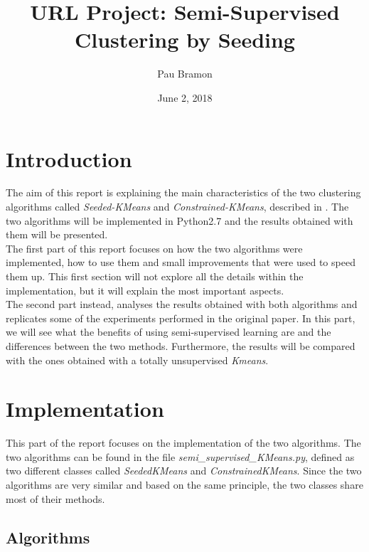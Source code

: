 \documentclass[11pt]{article}
\begin{document}
%
\title{URL Project: Semi-Supervised Clustering by Seeding}
\date{June 2, 2018}
\author{Pau Bramon}
\maketitle

\section{Introduction}

The aim of this report is explaining the main characteristics of the two clustering algorithms called \textit{Seeded-KMeans} and \textit{Constrained-KMeans}, described in \cite{Basu:2002:SCS:645531.656012}. The two algorithms will be implemented in Python2.7 and the results obtained with them will be presented. \\
The first part of this report focuses on how the two algorithms were implemented, how to use them and small improvements that were used to speed them up. This first section will not explore all the details within the implementation, but it will explain the most important aspects. \\
The second part instead, analyses the results obtained with both algorithms and replicates some of the experiments performed in the original paper. In this part, we will see what the benefits of using semi-supervised learning are and the differences between the two methods. Furthermore, the results will be compared with the ones obtained with a totally unsupervised \textit{Kmeans}. 

\section{Implementation}

This part of the report focuses on the implementation of the two algorithms. The two algorithms can be found in the file \textit{semi\_supervised\_KMeans.py}, defined as two different classes called \textit{SeededKMeans} and \textit{ConstrainedKMeans}. Since the two algorithms are very similar and based on the same principle, the two classes share most of their methods. 

\subsection{Algorithms}
\end{document}
